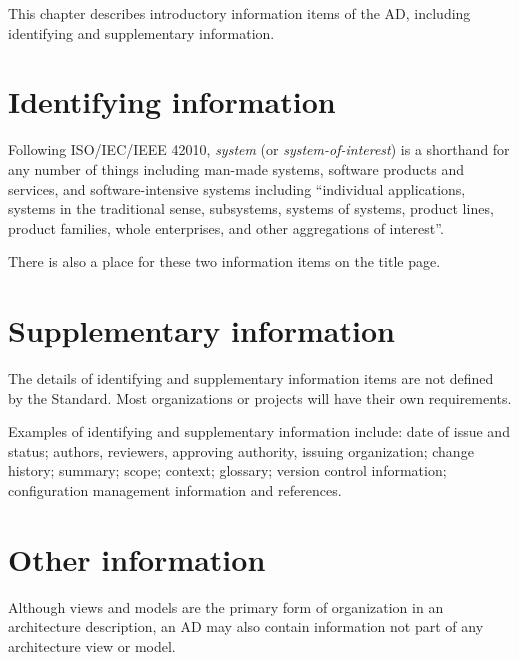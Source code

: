\documentclass[10pt,oneside]{report}
\begin{document}
This chapter describes introductory information items of the AD,
including identifying and supplementary information.


\section{Identifying information}\label{ad:idinfo}



Following ISO/IEC/IEEE 42010, \textit{system} (or
\textit{system-of-interest}) is a shorthand for any number of things
including man-made systems, software products and services, and
software-intensive systems including ``individual applications,
systems in the traditional sense, subsystems, systems of systems,
product lines, product families, whole enterprises, and other
aggregations of interest''. 

There is also a place for these two information items on the title
page.


\section{Supplementary information}\label{ad:supinfo}


The details of identifying and supplementary information items are not
defined by the Standard. Most organizations or projects will have
their own requirements.

Examples of identifying and supplementary information include: date of
issue and status; authors, reviewers, approving authority, issuing
organization; change history; summary; scope; context; glossary;
version control information; configuration management information and
references. 


\section{Other information}

Although views and models are the primary form of organization in an
architecture description, an AD may also contain information not part
of any architecture view or model. 
\end{document}
